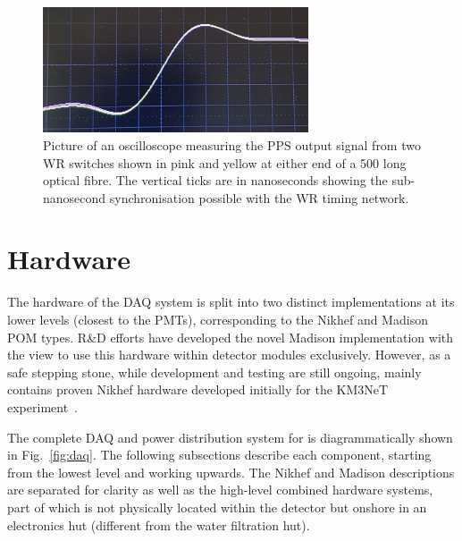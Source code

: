 \begin{figure} %
    \includegraphics[width=0.7\textwidth]{diagrams/5-daq/sync.pdf}
    \caption[Picture of White Rabbit timing synchronisation seen in \chips.]
    {Picture of an oscilloscope measuring the PPS output signal from two WR switches shown in pink
        and yellow at either end of a \unit{500}{} long optical fibre. The vertical
        ticks are in nanoseconds showing the sub-nanosecond synchronisation possible with the WR
        timing network.}
    \label{fig:sync}
\end{figure}

\section{Hardware} %
\label{sec:daq_hard} %

The hardware of the \chipsfive DAQ system is split into two distinct implementations at its lower
levels (closest to the PMTs), corresponding to the Nikhef and Madison POM types. \chips R\&D
efforts have developed the novel Madison implementation with the view to use this hardware within
detector modules exclusively. However, as a safe stepping stone, while development and testing are
still ongoing, \chipsfive mainly contains proven Nikhef hardware developed initially for the
KM3NeT experiment~\cite{adrian2016}.

The complete DAQ and power distribution system for \chipsfive is diagrammatically shown in
Fig.~\ref{fig:daq}. The following subsections describe each component, starting from the lowest
level and working upwards. The Nikhef and Madison descriptions are separated for clarity as well
as the high-level combined hardware systems, part of which is not physically located within the
detector but onshore in an electronics hut (different from the water filtration hut).

